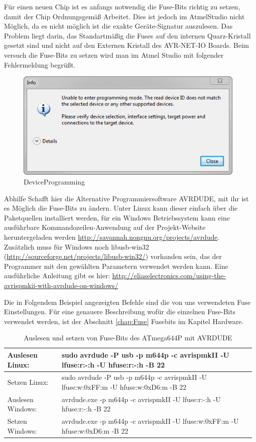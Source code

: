 Für einen neuen Chip ist es anfangs notwendig die Fuse-Bits richtig zu setzen,
damit der Chip Ordnungsgemäß Arbeitet.
Dies ist jedoch im AtmelStudio nicht Möglich, da es nicht möglich ist die exakte
Geräte-Signatur auszulesen.
Das Problem liegt darin, das Standartmäßig die Fuses auf den internen
Quarz-Kristall gesetzt sind und nicht auf den Externen Kristall des
AVR-NET-IO Boards.
Beim versuch die Fuse-Bits zu setzen wird man im Atmel Studio mit folgender
Fehlermeldung begrüßt. 
\begin{figure}[h]
\centering
\includegraphics[width=13cm]{content/pictures/Anleitung/neuerProzessor/AnleitungNeuerProzessor2_fehler.png}
\caption{DeviceProgramming}
\end{figure}

Abhilfe Schafft hier die Alternative Programmiersoftware AVRDUDE, mit ihr ist
es Möglich die Fuse-Bits zu ändern. Unter Linux kann dieser einfach über die
Paketquellen installiert werden, für ein Windows Betriebssystem kann eine
ausführbare Kommandozeilen-Anwendung auf der Projekt-Website heruntergeladen
werden \url{http://savannah.nongnu.org/projects/avrdude}. Zusätzlich muss für
Windows noch libusb-win32 (\url{http://sourceforge.net/projects/libusb-win32/})
vorhanden sein, das der Programmer mit den gewählten Parametern verwendet werden
kann. Eine ausführliche Anleitung gibt es hier:
\url{http://eliaselectronics.com/using-the-avrispmkii-with-avrdude-on-windows/}

Die in Folgendem Beispiel angezeigten Befehle sind die von uns verwendeten Fuse
Einstellungen. Für eine genauere Beschreibung wofür die einzelnen Fuse-Bits
verwendet werden, ist der Abschnitt \ref{chap:Fuse} Fusebits im Kapitel 
Hardware.

\begin{table}[H]
\begin{tabular}{| p{} | p{} |}
\hline
Auslesen Linux:& sudo avrdude -P usb -p m644p -c avrispmkII  -U lfuse:r:-:h -U hfuse:r:-:h -B 22 \\ \hline
Setzen Linux:& sudo avrdude -P usb -p m644p -c avrispmkII -U lfuse:w:0xFF:m -U hfuse:w:0xD6:m -B 22 \\ \hline
Auslesen Windows:& avrdude.exe -p m644p -c avrispmkII -U lfuse:r:-:h -U hfuse:r:-:h -B 22 \\ \hline 
Setzen Windows:& avrdude.exe -p m644p -c avrispmkII -U lfuse:w:0xFF:m -U hfuse:w:0xD6:m -B 22 \\ \hline
\end{tabular}
\caption{Auslesen und setzen von Fuse-Bits des ATmega644P mit AVRDUDE}
\label{ParameterAvrdude1}
\end{table}

